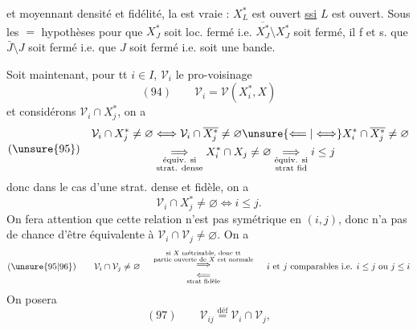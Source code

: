 
et moyennant densité et fidélité, la   est vraie : $X_L^*$ est ouvert \uline{ssi} $L$ est ouvert. Sous les $=$ hypothèses pour que $X_J^*$ soit loc. fermé i.e. $\overline{X_J^*}\setminus X_J^*$  soit fermé,  il f et s. que $\bar J\setminus J$ soit fermé i.e. que $J$ soit  fermé i.e. soit une bande.

Soit maintenant, pour tt $i\in I$, $\mathcal V_i$ le pro-voisinage
\[(94)\qquad\mathcal V_i=\mathcal V(X_i^*,X)\]
et considérons $\mathcal V_i\cap X_j^*$, on a
\[
(\unsure{95})\quad\begin{aligned}
\mathcal V_i\cap X_j^*\neq\varnothing&\Longleftrightarrow\mathcal V_i\cap\overline{X_j^*}\neq\varnothing\unsure{\Longleftarrow|\Longleftrightarrow} X_i^*\cap\overline{X_j^*}\neq\varnothing\\
&\underset{\substack{\text{équiv. si}\\\text{strat. dense}}}{\Longrightarrow}X_i^*\cap X_j\neq\varnothing\underset{\substack{\text{équiv. si}\\\text{strat fid}}}{\Longrightarrow}i\leq j
\end{aligned}
\]
donc dans le cas d'une strat. dense et fidèle,  on a
\[\mathcal V_i\cap X_j^*\neq\varnothing\Longleftrightarrow i\leq j.\]
On fera attention que cette relation n'est pas symétrique en $(i,j)$,  donc n'a pas de chance d'être équivalente à $\mathcal V_i\cap\mathcal V_j\neq\varnothing$. On a
\[
(\unsure{95|96})\qquad\mathcal V_i\cap\mathcal V_j\neq\varnothing\quad
\begin{array}{c}
\overset{\substack{\text{si $X$ métrisable, donc tt}\\\text{partie ouverte de $X$ est normale}}}{\Longrightarrow}\\
\underset{\text{strat fidèle}}{\Longleftarrow}
\end{array}
\quad\text{$i$ et $j$ comparables i.e. $i\leq j$ ou $j\leq i$}
\]
On posera
\[(97)\qquad\mathcal V_{ij}\overset{\mathrm{déf}}=\mathcal V_i\cap\mathcal V_j,\]
